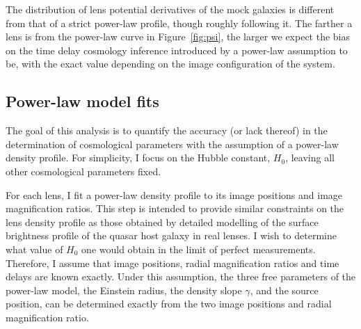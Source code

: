 \documentclass[usenatbib]{mnras}
\def\Fref#1{Figure~\ref{#1}\xspace}
\begin{document}
%
The distribution of lens potential derivatives of the mock galaxies is different from that of a strict power-law profile, though roughly following it.
The farther a lens is from the power-law curve in \Fref{fig:psi}, the larger we expect the bias on the time delay cosmology inference introduced by a power-law assumption to be, with the exact value depending on the image configuration of the system.

\subsection{Power-law model fits}

The goal of this analysis is to quantify the accuracy (or lack thereof) in the determination of cosmological parameters with the assumption of a power-law density profile.
For simplicity, I focus on the Hubble constant, $H_0$, leaving all other cosmological parameters fixed.

For each lens, I fit a power-law density profile to its image positions and image magnification ratios. This step is intended to provide similar constraints on the lens density profile as those obtained by detailed modelling of the surface brightness profile of the quasar host galaxy in real lenses.
I wish to determine what value of $H_0$ one would obtain in the limit of perfect measurements.
Therefore, I assume that image positions, radial magnification ratios and time delays are known exactly.
Under this assumption, the three free parameters of the power-law model, the Einstein radius, the density slope $\gamma$, and the source position, can be determined exactly from the two image positions and radial magnification ratio. 
\end{document}
